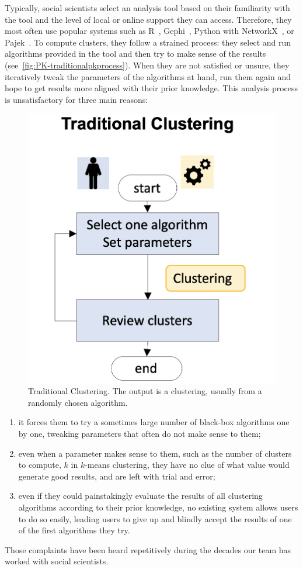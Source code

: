 Typically, social scientists select an analysis tool based on their familiarity with the tool and the level of local or online support they can access.
Therefore, they most often use popular systems such as R~\cite{Rstat}, Gephi~\cite{Gephi}, Python with NetworkX~\cite{NetworkX}, or Pajek~\cite{pajek}.
To compute clusters, they follow a strained process: they select and run algorithms provided in the tool and then try to make sense of the results (see~\autoref{fig:PK-traditionalpkprocess}).
When they are not satisfied or unsure, they iteratively tweak the parameters of the algorithms at hand, run them again and hope to get results more aligned with their prior knowledge. This analysis process is unsatisfactory for three main reasons:
\begin{figure}
    \includegraphics[width=0.5\columnwidth]{static/figures/PK-Clustering/VISPaperFigures/traditionalclustering.png}
    \caption{Traditional Clustering.  The output is a clustering, usually from a randomly chosen algorithm.}
    \label{fig:PK-traditionalpkprocess}
\end{figure}
\begin{enumerate}[left=0pt .. \parindent,nosep]
    \item it forces them to try a sometimes large number of black-box algorithms one by one, tweaking parameters that often do not make sense to them; \item even when a parameter makes sense to them, such as the number of clusters to compute, $k$ in $k$-means clustering, they have no clue of what value would generate good results, and are left with trial and error;
    \item even if they could %
    painstakingly evaluate the results of all clustering algorithms  according to their prior knowledge, no existing system allows users to do so easily, leading users to give up and blindly accept the results of one of the first algorithms they try.
\end{enumerate}
Those complaints have been heard repetitively during the decades our team has worked with social scientists.


